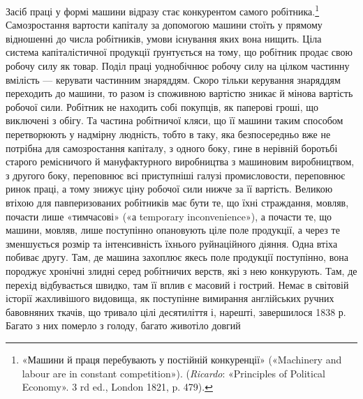 Засіб праці у формі машини відразу стає конкурентом самого
робітника.\footnote{
«Машини й праця перебувають у постійній конкуренції» («Machinery
and labour are in constant competition»). (\emph{Ricardo}: «Principles of
Political Economy». 3 rd ed., London 1821, p. 479).
} Самозростання вартости капіталу за допомогою
машини стоїть у прямому відношенні до числа робітників, умови
існування яких вона нищить. Ціла система капіталістичної продукції
ґрунтується на тому, що робітник продає свою робочу силу
як товар. Поділ праці уоднобічнює робочу силу на цілком частинну
вмілість — керувати частинним знаряддям. Скоро тільки
керування знаряддям переходить до машини, то разом із споживною
вартістю зникає й мінова вартість робочої сили. Робітник не
находить собі покупців, як паперові гроші, що виключені з обігу.
Та частина робітничої кляси, що її машини таким способом перетворюють
у надмірну людність, тобто в таку, яка безпосередньо
вже не потрібна для самозростання капіталу, з одного боку, гине
в нерівній боротьбі старого ремісничого й мануфактурного виробництва
з машиновим виробництвом, з другого боку, переповнює
всі приступніші галузі промисловости, переповнює ринок праці,
а тому знижує ціну робочої сили нижче за її вартість. Великою
втіхою для павперизованих робітників має бути те, що їхні страждання,
мовляв, почасти лише «тимчасові» («а temporary inconvenience»),
а почасти те, що машини, мовляв, лише поступінно
опановують ціле поле продукції, а через те зменшується розмір
та інтенсивність їхнього руйнаційного діяння. Одна втіха побиває
другу. Там, де машина захоплює якесь поле продукції поступінно,
вона породжує хронічні злидні серед робітничих верств, які з
нею конкурують. Там, де перехід відбувається швидко, там її
 вплив є масовий і гострий. Немає в світовій історії жахливішого
видовища, як поступінне вимирання англійських ручних бавовняних
ткачів, що тривало цілі десятиліття і, нарешті, завершилося
1838 р. Багато з них померло з голоду, багато животіло довгий
